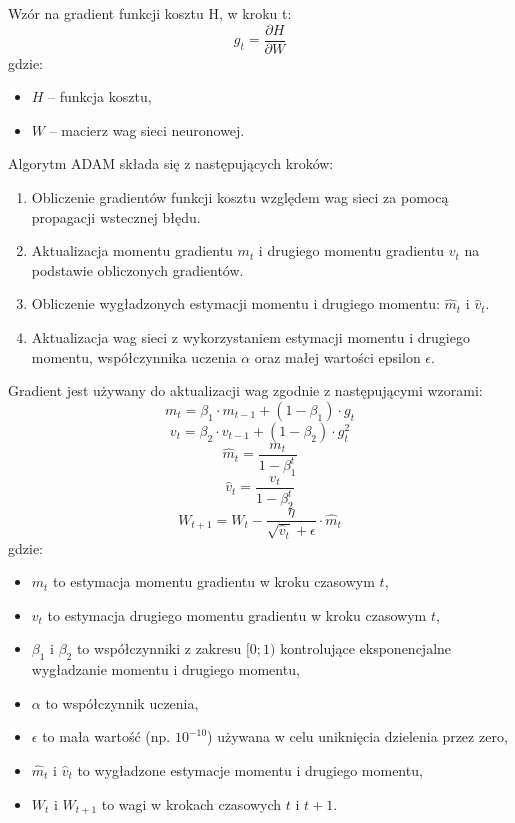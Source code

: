 \documentclass{article}
\begin{document}
Wzór na gradient funkcji kosztu H, w kroku t:
\[ g_t = \frac{\partial H}{\partial W} \]
gdzie:
\begin{itemize}
    \item \( H\) -- funkcja kosztu,
    \item \(W\) -- macierz wag sieci neuronowej.
\end{itemize}

Algorytm ADAM składa się z następujących kroków:
\begin{enumerate}
    \item Obliczenie gradientów funkcji kosztu względem wag sieci za pomocą propagacji wstecznej błędu.
    \item Aktualizacja momentu gradientu \(m_t\) i drugiego momentu gradientu \(v_t\) na podstawie obliczonych gradientów.
    \item Obliczenie wygładzonych estymacji momentu i drugiego momentu: \(\hat{m}_t\) i \(\hat{v}_t\).
    \item Aktualizacja wag sieci z wykorzystaniem estymacji momentu i drugiego momentu, współczynnika uczenia \(\alpha\) oraz małej wartości epsilon \(\epsilon\).
\end{enumerate}

Gradient jest używany do aktualizacji wag zgodnie z następującymi wzorami:
\[m_t = \beta_1 \cdot m_{t-1} + (1 - \beta_1) \cdot g_t\]
\[v_t = \beta_2 \cdot v_{t-1} + (1 - \beta_2) \cdot g_t^2\]
\[\hat{m}_t = \frac{m_t}{1 - \beta_1^t}\]
\[\hat{v}_t = \frac{v_t}{1 - \beta_2^t}\]
\[ W_{t+1} = W_t - \frac{\eta}{\sqrt{\hat{v}_t} + \epsilon} \cdot \hat{m}_t \]
gdzie:
\begin{itemize}
    \item \(m_t\) to estymacja momentu gradientu w kroku czasowym \(t\),
    \item \(v_t\) to estymacja drugiego momentu gradientu w kroku czasowym \(t\),
    \item \(\beta_1\) i \(\beta_2\) to współczynniki z zakresu \([0; 1)\) kontrolujące eksponencjalne wygładzanie momentu i drugiego momentu,
    \item \(\alpha\) to współczynnik uczenia,
    \item \(\epsilon\) to mała wartość (np. \(10^{-10}\)) używana w celu uniknięcia dzielenia przez zero,
    \item \(\hat{m}_t\) i \(\hat{v}_t\) to wygładzone estymacje momentu i drugiego momentu,
    \item \(W_{t}\) i \(W_{t+1}\) to wagi w krokach czasowych \(t\) i \(t+1\).
\end{itemize}
\end{document}
